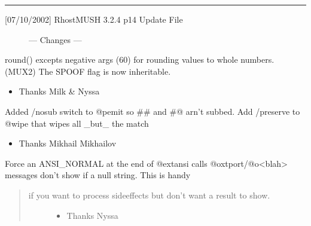 \documentclass[letterpaper,10pt,english]{sphinxmanual}
\begin{document}
\bigskip\hrule\bigskip

\begin{description}
\item[{{[}07/10/2002{]}             RhostMUSH 3.2.4 p14 Update File}] \leavevmode
\sphinxAtStartPar
—\sphinxhyphen{} Changes —\sphinxhyphen{}

\end{description}

\sphinxAtStartPar
round() excepts negative args (60) for rounding values to whole numbers. (MUX2)
The SPOOF flag is now inheritable.
\begin{itemize}
\item {} 
\sphinxAtStartPar
Thanks Milk \& Nyssa

\end{itemize}

\sphinxAtStartPar
Added /nosub switch to @pemit so \#\# and \#@ arn’t subbed.
Add /preserve to @wipe that wipes all \_but\_ the match
\begin{itemize}
\item {} 
\sphinxAtStartPar
Thanks Mikhail Mikhailov

\end{itemize}

\sphinxAtStartPar
Force an ANSI\_NORMAL at the end of @extansi calls
@oxtport/@o\textless{}blah\textgreater{} messages don’t show if a null string.  This is handy
\begin{quote}
\begin{description}
\item[{if you want to process sideeffects but don’t want a result to show.}] \leavevmode\begin{itemize}
\item {} 
\sphinxAtStartPar
Thanks Nyssa

\end{itemize}

\end{description}
\end{quote}
\end{document}

